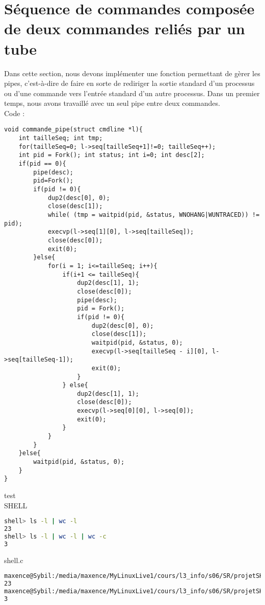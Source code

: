 \documentclass{report}
\begin{document}
		\section{S\'equence de commandes compos\'ee de deux commandes reli\'es par un tube}
			Dans cette section, nous devons impl\'ementer une fonction permettant de g\`erer les pipes, c'est-\`a-dire de faire en sorte de rediriger la sortie standard d'un processus ou d'une commande vers l'entr\'ee standard d'un autre processus. Dans un premier temps, nous avons travaill\'e avec un seul pipe entre deux commandes. \\Code :\\
			\begin{lstlisting}
void commande_pipe(struct cmdline *l){
	int tailleSeq; int tmp;
	for(tailleSeq=0; l->seq[tailleSeq+1]!=0; tailleSeq++);
	int pid = Fork(); int status; int i=0; int desc[2];
	if(pid == 0){
		pipe(desc);
		pid=Fork();
		if(pid != 0){
			dup2(desc[0], 0);
			close(desc[1]);
			while( (tmp = waitpid(pid, &status, WNOHANG|WUNTRACED)) != pid);
			execvp(l->seq[1][0], l->seq[tailleSeq]);
			close(desc[0]);
			exit(0);
		}else{
			for(i = 1; i<=tailleSeq; i++){
				if(i+1 <= tailleSeq){
					dup2(desc[1], 1);
					close(desc[0]);
					pipe(desc);
					pid = Fork();
					if(pid != 0){
						dup2(desc[0], 0);
						close(desc[1]);
						waitpid(pid, &status, 0);
						execvp(l->seq[tailleSeq - i][0], l->seq[tailleSeq-1]);
						exit(0);
					}
				} else{
					dup2(desc[1], 1);
					close(desc[0]);
					execvp(l->seq[0][0], l->seq[0]);
					exit(0);
				}
			}		
		}
	}else{
		waitpid(pid, &status, 0);
	}
}
			\end{lstlisting}
			test \\ SHELL
			\begin{lstlisting}[frame=single,basicstyle=\footnotesize,language=bash]
shell> ls -l | wc -l
23
shell> ls -l | wc -l | wc -c
3
			\end{lstlisting}
			shell.c
			\begin{lstlisting}[frame=single,basicstyle=\footnotesize,language=bash]
maxence@Sybil:/media/maxence/MyLinuxLive1/cours/l3_info/s06/SR/projetSHELL$ ls -l | wc -l
23
maxence@Sybil:/media/maxence/MyLinuxLive1/cours/l3_info/s06/SR/projetSHELL$ ls -l | wc -l | wc -c
3
			\end{lstlisting}
\end{document}
